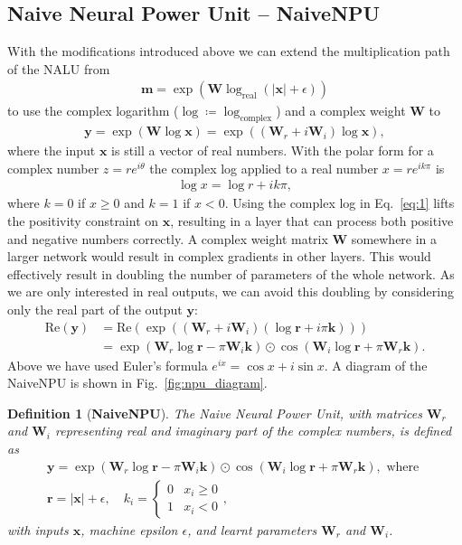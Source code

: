 \documentclass[9pt]{article}
\newtheorem*{definition}{Definition}
\newcommand{\real}{\text{Re}}
\newcommand{\Wre}{\bm W_{r}}
\newcommand{\Wim}{\bm W_{i}}
\begin{document}
\subsection{Naive Neural Power Unit -- NaiveNPU}%
\label{sub:naive_npu}

With the modifications introduced above we can extend the multiplication path
of the NALU from
\begin{align}
  \label{eq:nalu_mult_2}
  \bm m = \exp (\bm W\log_{\text{real}}(|\bm x|+\epsilon))
\end{align}
to use the complex logarithm ($\log\coloneqq\log_{\text{complex}}$) and a
complex weight $\bm W$ to
\begin{align}
  \label{eq:1}
  \bm y = \exp(\bm W\log \bm x) = \exp\left((\Wre + i\Wim) \log\bm x\right),
\end{align}
where the input $\bm x$ is still a vector of real numbers.
With the polar form for a complex number $z=re^{i\theta}$ the complex log applied
to a real number $x=re^{ik\pi}$ is
\begin{align}
  \log x = \log r + ik\pi,
\end{align}
where $k=0$ if $x\geq0$ and $k=1$ if $x<0$.
Using the complex log in Eq.~\ref{eq:1} lifts the positivity constraint on $\bm x$,
resulting in a layer that can process both positive and negative numbers correctly.
A complex weight matrix $\bm W$ somewhere in a larger network would result in complex
gradients in other layers.  This would effectively result in doubling the
number of parameters of the whole network. As we are only interested in real
outputs, we can avoid this doubling by considering only the real part
of the output $\bm y$:
\begin{align}
  \real(\bm y) &= \real(\exp((\Wre + i\Wim)(\log\bm r + i\pi\bm k))) \\
    \label{eq:npumult}
    &= \exp(\Wre\log\bm r - \pi\Wim\bm k) \odot \cos(\Wim\log\bm r + \pi\Wre\bm k).
\end{align}
Above we have used Euler's formula $e^{ix} = \cos x + i\sin x$.
A diagram of the NaiveNPU is shown in Fig.~\ref{fig:npu_diagram}.

\begin{definition}[{\bf NaiveNPU}]
  The Naive Neural Power Unit, with matrices $\Wre$ and
  $\Wim$ representing real and imaginary part of the complex numbers, is defined as
  \begin{gather}
    \label{eq:naivenpu_def}
    \bm y = \exp(\Wre \log\bm r - \pi\Wim\bm k) \odot \cos(\Wim\log \bm r + \pi\Wre\bm k), \text{ where }\\
    \nonumber
    \bm r = |\bm x| + \epsilon,
    \quad
    k_i = \begin{cases}
       0 & x_i \geq 0 \\
       1 & x_i < 0
    \end{cases},
  \end{gather}
  with inputs $\bm x$, machine epsilon $\epsilon$, and learnt parameters $\Wre$ and $\Wim$.
\end{definition}
\end{document}

